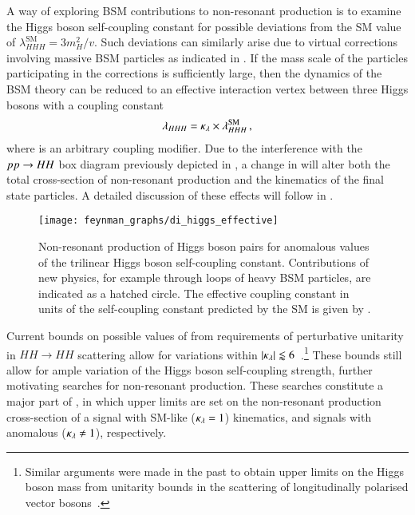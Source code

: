 A way of exploring BSM contributions to non-resonant \HH production is to
examine the Higgs boson self-coupling constant for possible deviations from the
SM value of $\lambda_{HHH}^\text{SM} = 3 m_{H}^2 / v$. Such deviations can
similarly arise due to virtual corrections involving massive BSM particles as
indicated in . If the mass scale of the particles
participating in the corrections is sufficiently large, then the dynamics of the
BSM theory can be reduced to an effective interaction vertex between three Higgs
bosons with a coupling constant
\begin{align*}
  \lambda_{HHH} = \kappa_{\lambda} \times \lambda_{HHH}^{\text{SM}} \,\text{,}
\end{align*}
where \klambda is an arbitrary coupling modifier. Due to the interference with
the $pp \to HH$ box diagram previously depicted in
, a change in \klambda will alter both the total
cross-section of non-resonant \HH production and the kinematics of the final
state particles. A detailed discussion of these effects will follow in
.

\begin{figure}[htbp]
  \centering

  \texttt{[image: feynman\_graphs/di\_higgs\_effective]}

  \caption{Non-resonant production of Higgs boson pairs for anomalous values of
    the trilinear Higgs boson self-coupling constant.  Contributions of new
    physics, for example through loops of heavy BSM particles, are indicated as
    a hatched circle. The effective coupling constant in units of the
    self-coupling constant predicted by the SM is given by \klambda.}%
  \label{fig:bsm_hh_prod_feyn}
\end{figure}

%
Current bounds on possible values of \klambda from requirements of perturbative
unitarity in $HH \to HH$ scattering allow for variations within
$|\kappa_{\lambda}| \lessapprox 6$~\cite{DiLuzio:2017tfn}.\footnote{Similar arguments
  were made in the past to obtain upper limits on the Higgs boson mass from
  unitarity bounds in the scattering of longitudinally polarised vector
  bosons~\cite{Lee:1977eg}.} These bounds still allow for ample variation of the
Higgs boson self-coupling strength, further motivating searches for non-resonant
\HH production. These searches constitute a major part of
, in which upper limits are set on the
non-resonant \HH production cross-section of a signal with SM-like
($\kappa_{\lambda} = 1$) kinematics, and signals with anomalous \klambda
($\kappa_{\lambda} \neq 1$), respectively.

